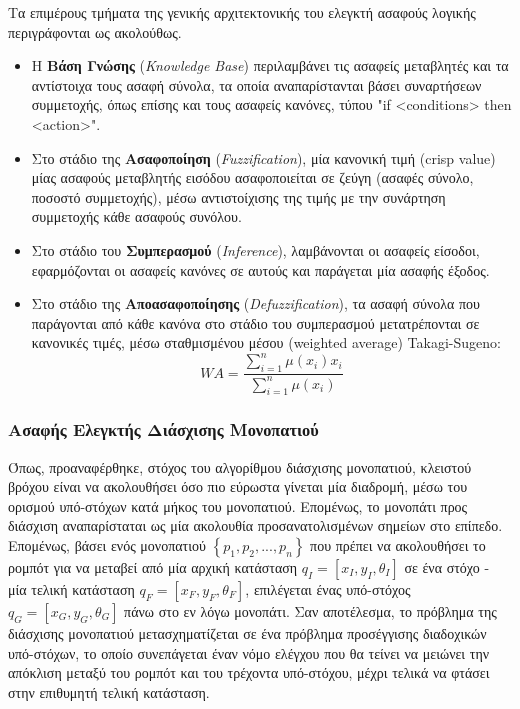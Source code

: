 \bigskip\noindent
Τα επιμέρους τμήματα της γενικής αρχιτεκτονικής του ελεγκτή ασαφούς λογικής περιγράφονται ως ακολούθως.
\begin{itemize}
	\item Η \textbf{Βάση Γνώσης} (\textit{Knowledge Base}) περιλαμβάνει τις ασαφείς μεταβλητές και τα αντίστοιχα τους ασαφή σύνολα, τα οποία αναπαρίστανται βάσει συναρτήσεων συμμετοχής, όπως επίσης και τους ασαφείς κανόνες, τύπου "if <conditions> then <action>".
	\item Στο στάδιο της \textbf{Aσαφοποίηση} (\textit{Fuzzification}), μία κανονική τιμή (crisp value) μίας ασαφούς μεταβλητής εισόδου ασαφοποιείται σε ζεύγη (ασαφές σύνολο, ποσοστό συμμετοχής), μέσω αντιστοίχισης της τιμής με την συνάρτηση συμμετοχής κάθε ασαφούς συνόλου.
	\item Στο στάδιο του \textbf{Συμπερασμού} (\textit{Inference}), λαμβάνονται οι ασαφείς είσοδοι, εφαρμόζονται οι ασαφείς κανόνες σε αυτούς και παράγεται μία ασαφής έξοδος.
	\item Στο στάδιο της \textbf{Αποασαφοποίησης} (\textit{Defuzzification}), τα ασαφή σύνολα που παράγονται από κάθε κανόνα στο στάδιο του συμπερασμού μετατρέπονται σε κανονικές τιμές, μέσω σταθμισμένου μέσου (weighted average) Takagi-Sugeno:
	\begin{equation}
		WA = \frac{\sum_{i=1}^n \mu(x_i)x_i}{\sum_{i=1}^n \mu(x_i)}
	\end{equation}
\end{itemize}

\subsubsection{Ασαφής Ελεγκτής Διάσχισης Μονοπατιού}
Όπως, προαναφέρθηκε, στόχος του αλγορίθμου διάσχισης μονοπατιού, κλειστού βρόχου είναι να ακολουθήσει όσο πιο εύρωστα γίνεται μία διαδρομή, μέσω του ορισμού υπό-στόχων κατά μήκος του μονοπατιού. Επομένως, το μονοπάτι προς διάσχιση αναπαρίσταται ως μία ακολουθία προσανατολισμένων σημείων στο επίπεδο. Επομένως, βάσει ενός μονοπατιού $\left\{p_1, p_2, ..., p_n\right\}$ που πρέπει να ακολουθήσει το ρομπότ για να μεταβεί από μία αρχική κατάσταση $q_I=[x_I, y_I, \theta_I]$ σε ένα στόχο - μία τελική κατάσταση $q_F=[x_F, y_F, \theta_F]$, επιλέγεται ένας υπό-στόχος $q_G=[x_G, y_G, \theta_G]$ πάνω στο εν λόγω μονοπάτι. Σαν αποτέλεσμα, το πρόβλημα της διάσχισης μονοπατιού μετασχηματίζεται σε ένα πρόβλημα προσέγγισης διαδοχικών υπό-στόχων, το οποίο συνεπάγεται έναν νόμο ελέγχου που θα τείνει να μειώνει την απόκλιση μεταξύ του ρομπότ και του τρέχοντα υπό-στόχου, μέχρι τελικά να φτάσει στην επιθυμητή τελική κατάσταση.

